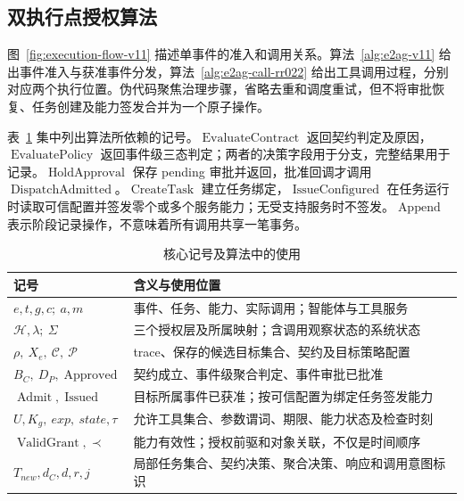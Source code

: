 \subsection{双执行点授权算法}



图~\ref{fig:execution-flow-v11} 描述单事件的准入和调用关系。算法~\ref{alg:e2ag-v11} 给出事件准入与获准事件分发，算法~\ref{alg:e2ag-call-rr022} 给出工具调用过程，分别对应两个执行位置。伪代码聚焦治理步骤，省略去重和调度重试，但不将审批恢复、任务创建及能力签发合并为一个原子操作。

表~\ref{tab:notation-rr022} 集中列出算法所依赖的记号。$\operatorname{EvaluateContract}$ 返回契约判定及原因，$\operatorname{EvaluatePolicy}$ 返回事件级三态判定；两者的决策字段用于分支，完整结果用于记录。$\operatorname{HoldApproval}$ 保存 pending 审批并返回，批准回调才调用 $\operatorname{DispatchAdmitted}$。$\operatorname{CreateTask}$ 建立任务绑定，$\operatorname{IssueConfigured}$ 在任务运行时读取可信配置并签发零个或多个服务能力；无受支持服务时不签发。$\operatorname{Append}$ 表示阶段记录操作，不意味着所有调用共享一笔事务。

\begin{table}[htbp]
\centering
\caption{核心记号及算法中的使用}
\label{tab:notation-rr022}
\small
\begin{tabular}{p{34mm}p{104mm}}
\toprule
记号 & 含义与使用位置 \\
\midrule
$e,t,g,c;\ a,m$ & 事件、任务、能力、实际调用；智能体与工具服务 \\
$\mathcal H,\lambda;\ \Sigma$ & 三个授权层及所属映射；含调用观察状态的系统状态 \\
$\rho,\ X_e,\ \mathcal C,\ \mathcal P$ & trace、保存的候选目标集合、契约及目标策略配置 \\
$B_C,\ D_P,\operatorname{Approved}$ & 契约成立、事件级聚合判定、事件审批已批准 \\
$\operatorname{Admit},\operatorname{Issued}$ & 目标所属事件已获准；按可信配置为绑定任务签发能力 \\
$U,K_g,\ exp,\ state,\tau$ & 允许工具集合、参数谓词、期限、能力状态及检查时刻 \\
$\operatorname{ValidGrant},\prec$ & 能力有效性；授权前驱和对象关联，不仅是时间顺序 \\
$T_{new},d_C,d,r,j$ & 局部任务集合、契约决策、聚合决策、响应和调用意图标识 \\
\bottomrule
\end{tabular}
\end{table}

